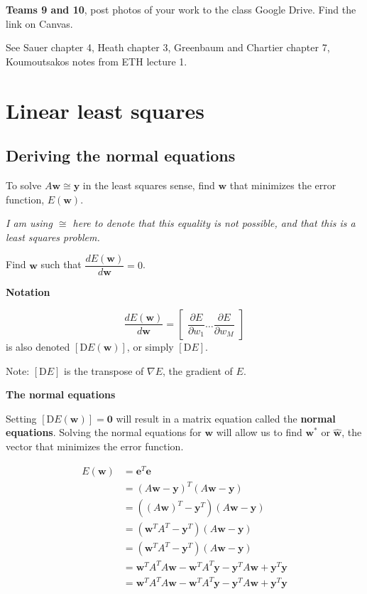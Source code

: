 \documentclass[12pt,letterpaper,noanswers]{exam}
\newcommand{\vc}[1]{\boldsymbol{#1}}
\begin{document}
\textbf{Teams 9 and 10}, post photos of your work to the class Google Drive.  Find the link on Canvas.

\noindent See Sauer chapter 4, Heath chapter 3, Greenbaum and Chartier chapter 7, Koumoutsakos notes from ETH lecture 1.


\section{Linear least squares}



\subsection{Deriving the normal equations}


 To solve $A\vc{w} \cong \vc{y}$ in the least squares sense, find $\vc{w}$ that minimizes the error function, $E(\vc{w})$.
 
 \emph{I am using $\cong$ here to denote that this equality is not possible, and that this is a least squares problem.}
    
  Find $\vc{w}$ such that $\dfrac{dE(\vc{w})}{d\vc{w}} = 0$.
  
    \noindent\textbf{Notation}
  \begin{tcolorbox}
      \[\dfrac{dE(\vc{w})}{d\vc{w}}=\left[\begin{array}{ccc} \dfrac{\partial E}{\partial w_1} \hdots \dfrac{\partial E}{\partial w_M} \end{array}\right]\] is also denoted $\left[\text{D}E(\vc{w})\right]$, or simply $\left[\text{D}E\right]$.
      
      Note: $\left[\text{D}E\right]$ is the transpose of $\nabla E$, the gradient of $E$.
  \end{tcolorbox}
  

\noindent\textbf{The normal equations}
\begin{tcolorbox}
Setting $\left[\text{D}E(\vc{w})\right] = \vc{0}$ will result in a matrix equation called the \textbf{normal equations}.  Solving the normal equations for $\vc{w}$ will allow us to find $\vc{w}^*$ or $\hat{\vc{w}}$, the vector that minimizes the error function.
\end{tcolorbox}

\begin{align*}
        E(\vc{w}) &= \vc{e}^T\vc{e} \\
        &=(A\vc{w}-\vc{y})^T(A\vc{w}-\vc{y}) \\
        &=\left((A\vc{w})^T-\vc{y}^T\right)(A\vc{w}-\vc{y}) \\
        &=\left(\vc{w}^TA^T-\vc{y}^T\right)(A\vc{w}-\vc{y}) \\
        &=\left(\vc{w}^TA^T-\vc{y}^T\right)(A\vc{w}-\vc{y}) \\
        &=\vc{w}^TA^TA\vc{w}-\vc{w}^TA^T\vc{y}-\vc{y}^TA\vc{w} + \vc{y}^T\vc{y} \\
        &=\vc{w}^TA^TA\vc{w}-\vc{w}^TA^T\vc{y}-\vc{y}^TA\vc{w} + \vc{y}^T\vc{y}
    \end{align*}
    
\end{document}
